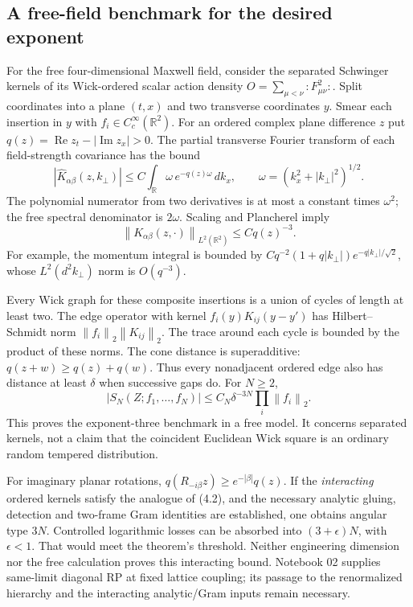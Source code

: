 \documentclass[11pt]{article}
\theoremstyle{remark}
\newcommand{\R}{\mathbb R}
\newcommand{\Rea}{\operatorname{Re}}
\newcommand{\Ima}{\operatorname{Im}}
\newcommand{\norm}[1]{\left\|#1\right\|}
\begin{document}
\subsection{A free-field benchmark for the desired exponent}

For the free four-dimensional Maxwell field, consider the separated
Schwinger kernels of its Wick-ordered scalar action density
$O=\sum_{\mu<\nu}:F_{\mu\nu}^2:$.
Split coordinates into a plane $(t,x)$ and two transverse coordinates $y$.
Smear each insertion in $y$ with $f_i\in C_c^\infty(\R^2)$.
For an ordered complex plane difference $z$ put
$q(z)=\Rea z_t-|\Ima z_x|>0$.
The partial transverse Fourier transform of each field-strength covariance
has the bound
\[
|\widehat K_{\alpha\beta}(z,k_\perp)|
\leq C\int_\R \omega\,e^{-q(z)\omega}\,dk_x,
\qquad \omega=(k_x^2+|k_\perp|^2)^{1/2}.
\]
The polynomial numerator from two derivatives is at most a constant
times $\omega^2$; the free spectral denominator is $2\omega$.
Scaling and Plancherel imply
\[
\norm{K_{\alpha\beta}(z,\cdot)}_{L^2(\R^2)}
\leq Cq(z)^{-3}.
\tag{4.1}
\]
For example, the momentum integral is bounded by
$Cq^{-2}(1+q|k_\perp|)e^{-q|k_\perp|/\sqrt2}$, whose
$L^2(d^2k_\perp)$ norm is $O(q^{-3})$.

Every Wick graph for these composite insertions is a union of cycles of
length at least two. The edge operator with kernel
$f_i(y)K_{ij}(y-y')$ has Hilbert--Schmidt norm
$\norm{f_i}_2\norm{K_{ij}}_2$.
The trace around each cycle is bounded by the product of these norms.
The cone distance is superadditive:
$q(z+w)\geq q(z)+q(w)$. Thus every nonadjacent ordered edge also has
distance at least $\delta$ when successive gaps do.
For $N\geq2$,
\[
|S_N(Z;f_1,\ldots,f_N)|
\leq C_N\delta^{-3N}\prod_i\norm{f_i}_2.
\tag{4.2}
\]
This proves the exponent-three benchmark in a free model.
It concerns separated kernels, not a claim that the coincident
Euclidean Wick square is an ordinary random tempered distribution.

For imaginary planar rotations,
$q(R_{-i\beta}z)\geq e^{-|\beta|}q(z)$.
If the \emph{interacting} ordered kernels satisfy the analogue of (4.2),
and the necessary analytic gluing, detection and two-frame Gram
identities are established, one obtains angular type $3N$.
Controlled logarithmic losses can be absorbed into $(3+\epsilon)N$,
with $\epsilon<1$.
That would meet the theorem's threshold.
Neither engineering dimension nor the free calculation proves this
interacting bound. Notebook 02 supplies same-limit diagonal RP at fixed
lattice coupling; its passage to the renormalized hierarchy and the
interacting analytic/Gram inputs remain necessary.
\end{document}
